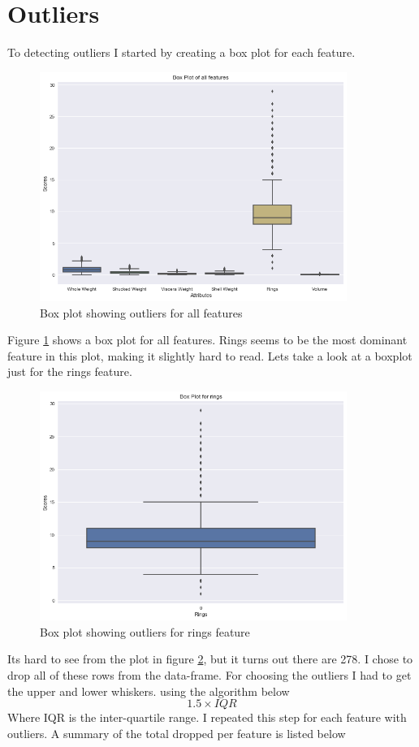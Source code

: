 \section{Outliers}

To detecting outliers I started by creating a box plot for each feature.
\begin{figure}[H]
  \centering
  \includegraphics[scale=0.5,width=100mm]{./images/abalone-outlier-1.png}
  \caption{Box plot showing outliers for all features}
  \label{fig:abalone-outlier-1}
\end{figure}
Figure \ref{fig:abalone-outlier-1} shows a box plot for all features. Rings seems to be the most dominant feature in this plot, making it slightly hard to read. Lets take a look at a boxplot just for the rings feature.
\begin{figure}[H]
  \centering
  \includegraphics[scale=0.5,width=100mm]{./images/abalone-outlier-rings.png}
  \caption{Box plot showing outliers for rings feature}
  \label{fig:abalone-outlier-rings}
\end{figure}
Its hard to see from the plot in figure \ref{fig:abalone-outlier-rings}, but it turns out there are 278. I chose to drop all of these rows from the data-frame. For choosing the outliers I had to get the upper and lower whiskers. using the algorithm below
\begin{equation}
    1.5 \times IQR
\end{equation}
Where IQR is the inter-quartile range. I repeated this step for each feature with outliers. A summary of the total dropped per feature is listed below

